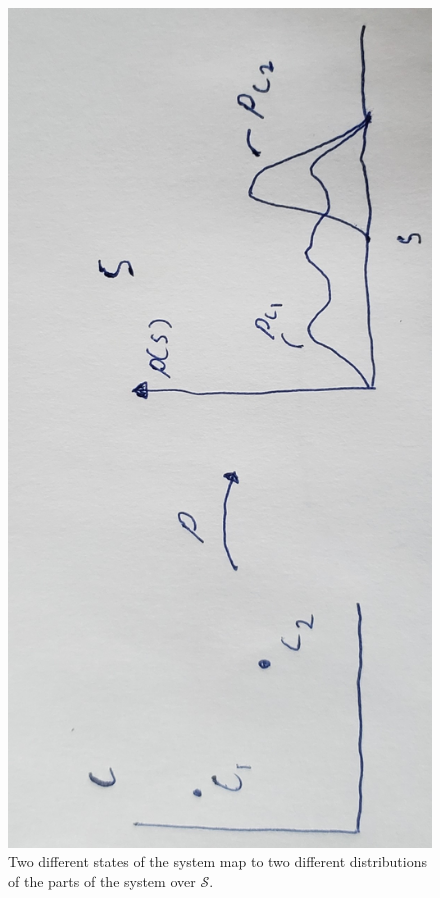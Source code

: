 \documentclass{article}
\begin{document}
\begin{figure}[!ht]
\centerline{\includegraphics[width=\textwidth,angle=-90,scale=.35]{diagram2.jpg}}
\caption{Two different states of the system map to two different distributions of the parts of the system over $\mathcal{S}$.}
\end{figure}
\end{document}
